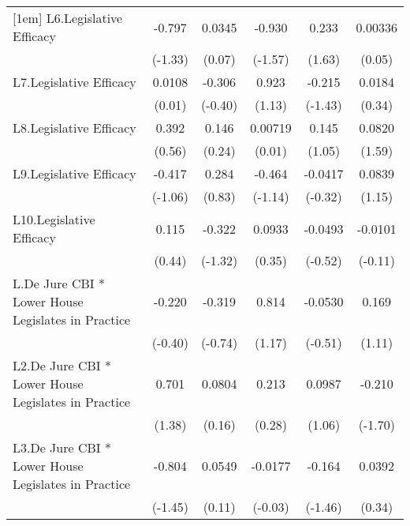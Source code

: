 {\begin{longtable}{l*{5}{c}}
[1em]
L6.Legislative Efficacy&   -0.797         &   0.0345         &   -0.930         &    0.233         &  0.00336         \\
                &  (-1.33)         &   (0.07)         &  (-1.57)         &   (1.63)         &   (0.05)         \\
[1em]
L7.Legislative Efficacy&   0.0108         &   -0.306         &    0.923         &   -0.215         &   0.0184         \\
                &   (0.01)         &  (-0.40)         &   (1.13)         &  (-1.43)         &   (0.34)         \\
[1em]
L8.Legislative Efficacy&    0.392         &    0.146         &  0.00719         &    0.145         &   0.0820         \\
                &   (0.56)         &   (0.24)         &   (0.01)         &   (1.05)         &   (1.59)         \\
[1em]
L9.Legislative Efficacy&   -0.417         &    0.284         &   -0.464         &  -0.0417         &   0.0839         \\
                &  (-1.06)         &   (0.83)         &  (-1.14)         &  (-0.32)         &   (1.15)         \\
[1em]
L10.Legislative Efficacy&    0.115         &   -0.322         &   0.0933         &  -0.0493         &  -0.0101         \\
                &   (0.44)         &  (-1.32)         &   (0.35)         &  (-0.52)         &  (-0.11)         \\
[1em]
L.De Jure CBI * Lower House Legislates in Practice&   -0.220         &   -0.319         &    0.814         &  -0.0530         &    0.169         \\
                &  (-0.40)         &  (-0.74)         &   (1.17)         &  (-0.51)         &   (1.11)         \\
[1em]
L2.De Jure CBI * Lower House Legislates in Practice&    0.701         &   0.0804         &    0.213         &   0.0987         &   -0.210         \\
                &   (1.38)         &   (0.16)         &   (0.28)         &   (1.06)         &  (-1.70)         \\
[1em]
L3.De Jure CBI * Lower House Legislates in Practice&   -0.804         &   0.0549         &  -0.0177         &   -0.164         &   0.0392         \\
                &  (-1.45)         &   (0.11)         &  (-0.03)         &  (-1.46)         &   (0.34)         \\

\end{longtable}}
